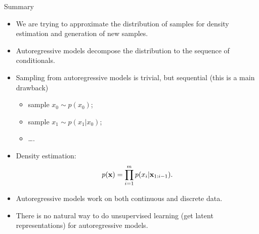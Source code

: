 \begin{frame}{Summary}
    \begin{itemize}
    	\item We are trying to approximate the distribution of samples for density estimation and generation of new samples.
    	\item Autoregressive models decompose the distribution to the sequence of conditionals.
        \item Sampling from autoregressive models is trivial, but sequential (this is a main drawback)
        \begin{itemize}
            \item sample $x_0 \sim p(x_0)$;
            \item sample $x_1 \sim p(x_1 | x_0)$;
            \item \dots.
        \end{itemize}
        \item Density estimation:
        \vspace{-0.2cm}
        \[
            p(\mathbf{x}) = \prod_{i=1}^m p(x_i | \mathbf{x}_{1:i - 1}).
        \]
        \vspace{-0.2cm}
        \item Autoregressive models work on both continuous and discrete data.
        \item There is no natural way to do unsupervised learning (get latent representations) for autoregressive models.
    \end{itemize}
\end{frame}

 